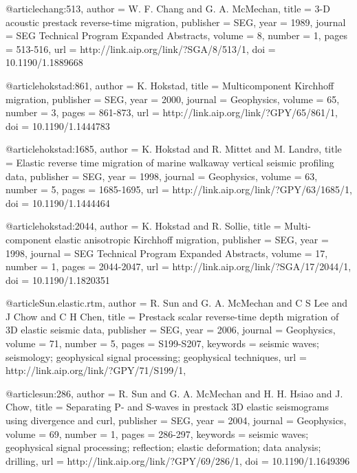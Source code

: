 @article{chang:513,
  author =	 {W. F. Chang and G. A. McMechan},
  title =	 {3-{D} acoustic prestack reverse-time migration},
  publisher =	 {SEG},
  year =	 1989,
  journal =	 {SEG Technical Program Expanded Abstracts},
  volume =	 8,
  number =	 1,
  pages =	 {513-516},
  url =		 {http://link.aip.org/link/?SGA/8/513/1},
  doi =		 {10.1190/1.1889668}
}

@article{hokstad:861,
  author =	 {K. Hokstad},
  title =	 {Multicomponent {K}irchhoff migration},
  publisher =	 {SEG},
  year =	 2000,
  journal =	 {Geophysics},
  volume =	 65,
  number =	 3,
  pages =	 {861-873},
  url =		 {http://link.aip.org/link/?GPY/65/861/1},
  doi =		 {10.1190/1.1444783}
}

@article{hokstad:1685,
  author =	 {K. Hokstad and R. Mittet and M. Landr\o},
  title =	 {Elastic reverse time migration of marine walkaway
                  vertical seismic profiling data},
  publisher =	 {SEG},
  year =	 1998,
  journal =	 {Geophysics},
  volume =	 63,
  number =	 5,
  pages =	 {1685-1695},
  url =		 {http://link.aip.org/link/?GPY/63/1685/1},
  doi =		 {10.1190/1.1444464}
}

@article{hokstad:2044,
  author =	 {K. Hokstad and R. Sollie},
  title =	 {Multi-component elastic anisotropic {K}irchhoff
                  migration},
  publisher =	 {SEG},
  year =	 1998,
  journal =	 {SEG Technical Program Expanded Abstracts},
  volume =	 17,
  number =	 1,
  pages =	 {2044-2047},
  url =		 {http://link.aip.org/link/?SGA/17/2044/1},
  doi =		 {10.1190/1.1820351}
}

@article{Sun.elastic.rtm,
  author =	 {R. Sun and G. A. McMechan and C S Lee
                  and J Chow and C H Chen},
  title =	 {Prestack scalar reverse-time depth migration of 3{D}
                  elastic seismic data},
  publisher =	 {SEG},
  year =	 2006,
  journal =	 {Geophysics},
  volume =	 71,
  number =	 5,
  pages =	 {S199-S207},
  keywords =	 {seismic waves; seismology; geophysical signal
                  processing; geophysical techniques},
  url =		 {http://link.aip.org/link/?GPY/71/S199/1},
}

@article{sun:286,
  author =	 {R. Sun and G. A. McMechan and H. H. Hsiao
                  and J. Chow},
  title =	 {Separating {P}- and {S}-waves in prestack {3D}
                  elastic seismograms using divergence and curl},
  publisher =	 {SEG},
  year =	 2004,
  journal =	 {Geophysics},
  volume =	 69,
  number =	 1,
  pages =	 {286-297},
  keywords =	 {seismic waves; geophysical signal processing;
                  reflection; elastic deformation; data analysis;
                  drilling},
  url =		 {http://link.aip.org/link/?GPY/69/286/1},
  doi =		 {10.1190/1.1649396}
}


